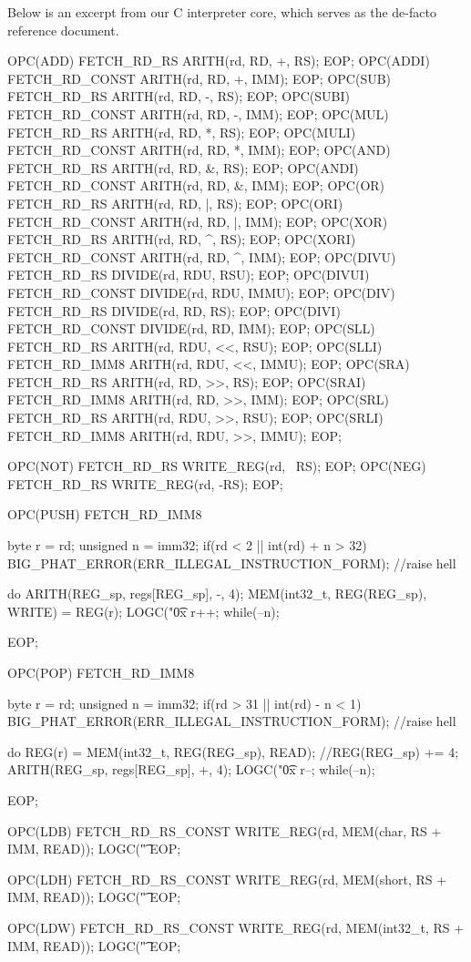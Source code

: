 \documentclass {article}
\begin{document}
Below is an excerpt from our C interpreter core, which serves as the de-facto reference document.

\begin{verbatimtab}

OPC(ADD)	FETCH_RD_RS	ARITH(rd, RD, +, RS);	EOP;
OPC(ADDI)	FETCH_RD_CONST	ARITH(rd, RD, +, IMM);	EOP;
OPC(SUB)	FETCH_RD_RS	ARITH(rd, RD, -, RS);	EOP;
OPC(SUBI)	FETCH_RD_CONST	ARITH(rd, RD, -, IMM);	EOP;
OPC(MUL)	FETCH_RD_RS	ARITH(rd, RD, *, RS);	EOP;
OPC(MULI)	FETCH_RD_CONST	ARITH(rd, RD, *, IMM);	EOP;
OPC(AND)	FETCH_RD_RS	ARITH(rd, RD, &, RS);	EOP;
OPC(ANDI)	FETCH_RD_CONST	ARITH(rd, RD, &, IMM);	EOP;
OPC(OR)	FETCH_RD_RS	ARITH(rd, RD, |, RS);	EOP;
OPC(ORI)	FETCH_RD_CONST	ARITH(rd, RD, |, IMM);	EOP;
OPC(XOR)	FETCH_RD_RS	ARITH(rd, RD, ^, RS);	EOP;
OPC(XORI)	FETCH_RD_CONST	ARITH(rd, RD, ^, IMM);	EOP;
OPC(DIVU)	FETCH_RD_RS	DIVIDE(rd, RDU, RSU);	EOP;
OPC(DIVUI)	FETCH_RD_CONST	DIVIDE(rd, RDU, IMMU);	EOP;
OPC(DIV)	FETCH_RD_RS	DIVIDE(rd, RD, RS);		EOP;
OPC(DIVI)	FETCH_RD_CONST	DIVIDE(rd, RD, IMM);	EOP;
OPC(SLL)	FETCH_RD_RS	ARITH(rd, RDU, <<, RSU);	EOP;
OPC(SLLI)	FETCH_RD_IMM8	ARITH(rd, RDU, <<, IMMU);	EOP;
OPC(SRA)	FETCH_RD_RS	ARITH(rd, RD, >>, RS);	EOP;
OPC(SRAI)	FETCH_RD_IMM8	ARITH(rd, RD, >>, IMM);	EOP;
OPC(SRL)	FETCH_RD_RS	ARITH(rd, RDU, >>, RSU);	EOP;
OPC(SRLI)	FETCH_RD_IMM8	ARITH(rd, RDU, >>, IMMU);	EOP;

OPC(NOT)	FETCH_RD_RS	WRITE_REG(rd, ~RS);	EOP;
OPC(NEG)	FETCH_RD_RS	WRITE_REG(rd, -RS);	EOP;

OPC(PUSH)	FETCH_RD_IMM8
{
	byte r = rd;
	unsigned n = imm32;
	if(rd < 2 || int(rd) + n > 32) {
		BIG_PHAT_ERROR(ERR_ILLEGAL_INSTRUCTION_FORM); //raise hell
	}

	do {
		ARITH(REG_sp, regs[REG_sp], -, 4);
		MEM(int32_t, REG(REG_sp), WRITE) = REG(r);
		LOGC("\t0x%
		r++;
	} while(--n);
}
EOP;

OPC(POP) FETCH_RD_IMM8
{
	byte r = rd;
	unsigned n = imm32;
	if(rd > 31 || int(rd) - n < 1)
		BIG_PHAT_ERROR(ERR_ILLEGAL_INSTRUCTION_FORM); //raise hell

	do {
		REG(r) = MEM(int32_t, REG(REG_sp), READ);
		//REG(REG_sp) += 4;
		ARITH(REG_sp, regs[REG_sp], +, 4);
		LOGC("\t0x%
		r--;
	} while(--n);
}
EOP;

OPC(LDB)
{
	FETCH_RD_RS_CONST
	WRITE_REG(rd, MEM(char, RS + IMM, READ));
	LOGC("\t%
}
EOP;

OPC(LDH)
{
	FETCH_RD_RS_CONST
	WRITE_REG(rd, MEM(short, RS + IMM, READ));
	LOGC("\t%
}
EOP;

OPC(LDW)
{
	FETCH_RD_RS_CONST
	WRITE_REG(rd, MEM(int32_t, RS + IMM, READ));
	LOGC("\t%
}
EOP;


\end{verbatimtab}
\end{document}
